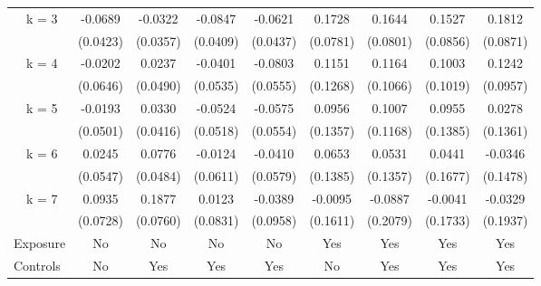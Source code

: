 {\begin{tabular}{l*{8}{c}}
\addlinespace
~~k = 3         &  -0.0689         &  -0.0322         &  -0.0847\sym{*}  &  -0.0621         &   0.1728\sym{*}  &   0.1644\sym{*}  &   0.1527         &   0.1812\sym{*}  \\
                & (0.0423)         & (0.0357)         & (0.0409)         & (0.0437)         & (0.0781)         & (0.0801)         & (0.0856)         & (0.0871)         \\
\addlinespace
~~k = 4         &  -0.0202         &   0.0237         &  -0.0401         &  -0.0803         &   0.1151         &   0.1164         &   0.1003         &   0.1242         \\
                & (0.0646)         & (0.0490)         & (0.0535)         & (0.0555)         & (0.1268)         & (0.1066)         & (0.1019)         & (0.0957)         \\
\addlinespace
~~k = 5         &  -0.0193         &   0.0330         &  -0.0524         &  -0.0575         &   0.0956         &   0.1007         &   0.0955         &   0.0278         \\
                & (0.0501)         & (0.0416)         & (0.0518)         & (0.0554)         & (0.1357)         & (0.1168)         & (0.1385)         & (0.1361)         \\
\addlinespace
~~k = 6         &   0.0245         &   0.0776         &  -0.0124         &  -0.0410         &   0.0653         &   0.0531         &   0.0441         &  -0.0346         \\
                & (0.0547)         & (0.0484)         & (0.0611)         & (0.0579)         & (0.1385)         & (0.1357)         & (0.1677)         & (0.1478)         \\
\addlinespace
~~k = 7         &   0.0935         &   0.1877\sym{*}  &   0.0123         &  -0.0389         &  -0.0095         &  -0.0887         &  -0.0041         &  -0.0329         \\
                & (0.0728)         & (0.0760)         & (0.0831)         & (0.0958)         & (0.1611)         & (0.2079)         & (0.1733)         & (0.1937)         \\
\addlinespace
Exposure        &     {No}         &     {No}         &     {No}         &     {No}         &    {Yes}         &    {Yes}         &    {Yes}         &    {Yes}         \\
\addlinespace
Controls        &     {No}         &    {Yes}         &    {Yes}         &    {Yes}         &     {No}         &    {Yes}         &    {Yes}         &    {Yes}         \\

\end{tabular}}
